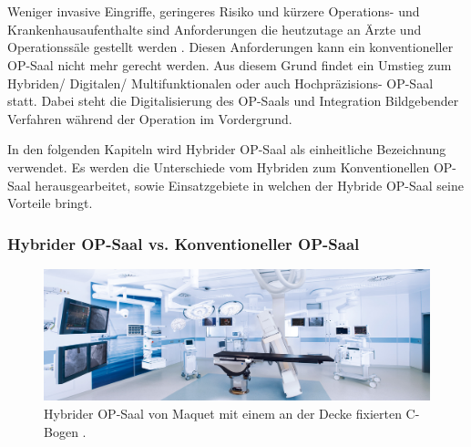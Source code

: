 \chapter{}
\label{sec:overview}

Weniger invasive Eingriffe, geringeres Risiko und kürzere Operations- und Krankenhausaufenthalte sind Anforderungen die heutzutage an Ärzte und Operationssäle gestellt werden \cite{DerDigitaleOperationssaal}. Diesen Anforderungen kann ein konventioneller OP-Saal nicht mehr gerecht werden. Aus diesem Grund findet ein Umstieg zum Hybriden/ Digitalen/ Multifunktionalen oder auch Hochpräzisions- OP-Saal statt. Dabei steht die Digitalisierung des OP-Saals und Integration Bildgebender Verfahren während der Operation im Vordergrund.

In den folgenden Kapiteln wird Hybrider OP-Saal als einheitliche Bezeichnung verwendet. Es werden die Unterschiede vom Hybriden zum Konventionellen OP-Saal herausgearbeitet, sowie Einsatzgebiete in welchen der Hybride OP-Saal seine Vorteile bringt.

\subsection{Hybrider OP-Saal vs. Konventioneller OP-Saal} 

\begin{figure} [H]
	\includegraphics[scale = .3]{Content/Pictures/hybrid-or.png}
	\caption{Hybrider OP-Saal von Maquet mit einem an der Decke fixierten C-Bogen \cite{Maquet}.}
	\label{fig:hybridor}
\end{figure}

